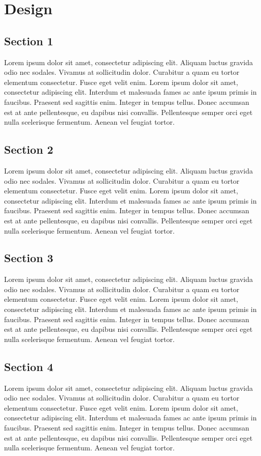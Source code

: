 \chapter{Design}

\section{Section 1}
Lorem ipsum dolor sit amet, consectetur adipiscing elit. Aliquam luctus gravida odio nec sodales. Vivamus at sollicitudin dolor. Curabitur a quam eu tortor elementum consectetur. Fusce eget velit enim. Lorem ipsum dolor sit amet, consectetur adipiscing elit. Interdum et malesuada fames ac ante ipsum primis in faucibus. Praesent sed sagittis enim. Integer in tempus tellus. Donec accumsan est at ante pellentesque, eu dapibus nisi convallis. Pellentesque semper orci eget nulla scelerisque fermentum. Aenean vel feugiat tortor.

\section{Section 2}
Lorem ipsum dolor sit amet, consectetur adipiscing elit. Aliquam luctus gravida odio nec sodales. Vivamus at sollicitudin dolor. Curabitur a quam eu tortor elementum consectetur. Fusce eget velit enim. Lorem ipsum dolor sit amet, consectetur adipiscing elit. Interdum et malesuada fames ac ante ipsum primis in faucibus. Praesent sed sagittis enim. Integer in tempus tellus. Donec accumsan est at ante pellentesque, eu dapibus nisi convallis. Pellentesque semper orci eget nulla scelerisque fermentum. Aenean vel feugiat tortor.

\section{Section 3}
Lorem ipsum dolor sit amet, consectetur adipiscing elit. Aliquam luctus gravida odio nec sodales. Vivamus at sollicitudin dolor. Curabitur a quam eu tortor elementum consectetur. Fusce eget velit enim. Lorem ipsum dolor sit amet, consectetur adipiscing elit. Interdum et malesuada fames ac ante ipsum primis in faucibus. Praesent sed sagittis enim. Integer in tempus tellus. Donec accumsan est at ante pellentesque, eu dapibus nisi convallis. Pellentesque semper orci eget nulla scelerisque fermentum. Aenean vel feugiat tortor.

\section{Section 4}
Lorem ipsum dolor sit amet, consectetur adipiscing elit. Aliquam luctus gravida odio nec sodales. Vivamus at sollicitudin dolor. Curabitur a quam eu tortor elementum consectetur. Fusce eget velit enim. Lorem ipsum dolor sit amet, consectetur adipiscing elit. Interdum et malesuada fames ac ante ipsum primis in faucibus. Praesent sed sagittis enim. Integer in tempus tellus. Donec accumsan est at ante pellentesque, eu dapibus nisi convallis. Pellentesque semper orci eget nulla scelerisque fermentum. Aenean vel feugiat tortor.
